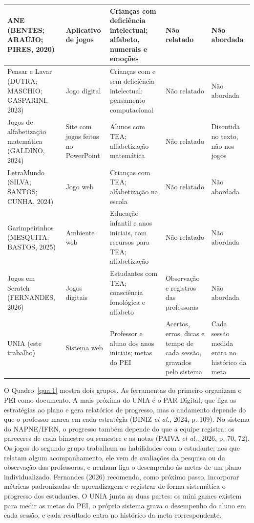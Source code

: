 \begin{tabelaIFTO}
\begin{longtable}{|L{0.2253}|L{0.16}|L{0.2253}|L{0.2008}|L{0.1885}|}
ANE (BENTES; ARAÚJO; PIRES, 2020) & Aplicativo de jogos & Crianças com deficiência intelectual; alfabeto, numerais e emoções & Não relatado & Não abordada \\ \hline
Pensar e Lavar (DUTRA; MASCHIO; GASPARINI, 2023) & Jogo digital & Crianças com e sem deficiência intelectual; pensamento computacional & Não relatado & Não abordada \\ \hline
Jogos de alfabetização matemática (GALDINO, 2024) & Site com jogos feitos no PowerPoint & Alunos com TEA; alfabetização matemática & Não relatado & Discutida no texto, não nos jogos \\ \hline
LetraMundo (SILVA; SANTOS; CUNHA, 2024) & Jogo web & Crianças com TEA; alfabetização na escola & Não relatado & Não abordada \\ \hline
Garimpeirinhos (MESQUITA; BASTOS, 2025) & Ambiente web & Educação infantil e anos iniciais, com recursos para TEA; alfabetização & Não relatado & Não abordada \\ \hline
Jogos em Scratch (FERNANDES, 2026) & Jogos digitais & Estudantes com TEA; consciência fonológica e alfabeto & Observação e registros das professoras & Não abordada \\ \hline
UNIA (este trabalho) & Sistema web & Professor e aluno dos anos iniciais; metas do PEI & Acertos, erros, dicas e tempo de cada sessão, gravados pelo sistema & Cada sessão medida entra no histórico da meta \\ \hline
\end{longtable}
\end{tabelaIFTO}

O Quadro~\ref{qua:1} mostra dois grupos. As ferramentas do primeiro organizam o PEI como documento. A mais próxima do UNIA é o PAR Digital, que liga as estratégias ao plano e gera relatórios de progresso, mas o andamento depende do que o professor marca em cada estratégia (DINIZ \textit{et al.}, 2024, p. 109). No sistema do NAPNE/IFRN, o progresso também depende do que a equipe registra: os pareceres de cada bimestre ou semestre e as notas (PAIVA \textit{et al.}, 2026, p. 70, 72). Os jogos do segundo grupo trabalham as habilidades com o estudante; nos que relatam algum acompanhamento, ele vem de avaliações da pesquisa ou da observação das professoras, e nenhum liga o desempenho às metas de um plano individualizado. Fernandes (2026) recomenda, como próximo passo, incorporar métricas padronizadas de aprendizagem e registrar de forma sistemática o progresso dos estudantes. O UNIA junta as duas partes: os mini games existem para medir as metas do PEI, o próprio sistema grava o desempenho do aluno em cada sessão, e cada resultado entra no histórico da meta correspondente.
